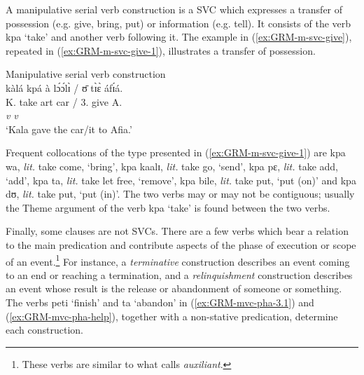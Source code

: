 
\z 
 \z

 
A  manipulative serial verb construction \citep[378]{Amek06} is a SVC
which  expresses a transfer of possession (e.g. give, bring, put)  or  
information (e.g. tell). It consists of the verb {\sls kpa} `take' and another
verb following it. The example in (\ref{ex:GRM-m-svc-give}), repeated in 
(\ref{ex:GRM-m-svc-give-1}), 
illustrates a transfer of possession. 

\newpage 
\begin{exe}

\ex\label{ex:GRM-m-svc-give-1}{\rm Manipulative serial verb construction}\\
\glll  kàlá kpá  {à lɔ́ɔ́lɪ̀ / ʊ̄} tɪ̀ɛ̀ áfɪ́á.\\
K. take  {{\sc art} car / 3.\sg} give A.\\
{} {\it v} {}  {\it v} {}\\
\glt  `Kala gave the car/it to Afia.'
 
\end{exe}

Frequent collocations of the type presented in (\ref{ex:GRM-m-svc-give-1}) are {\sls kpa wa}, {\it lit.}  take come,  `bring',  {\sls kpa kaalɪ}, {\it lit.} take go, `send', {\sls kpa pɛ}, {\it lit.} take add,  `add', {\sls kpa ta}, {\it lit.} take let free, `remove', {\sls kpa bile}, {\it lit.} take put,  `put (on)'  and {\sls kpa dʊ}, {\it lit.} take put,  `put (in)'. The two verbs may or may not be contiguous;  usually the Theme argument of the  verb {\sls kpa} `take'  is found between the two verbs.


Finally, some  clauses are not  SVCs.  There are a few verbs which bear a relation to the main predication and  contribute  aspects of the phase of execution or scope of an event.\footnote{These verbs are similar to what \citet[108]{Bonv88} calls {\it auxiliant}.} For instance, a {\it terminative}  construction describes an event coming to an end or reaching a termination, and  a {\it relinquishment} construction describes an event whose result is the release or abandonment of someone or something.  The verbs {\sls peti} `finish' and {\sls ta} `abandon' in (\ref{ex:GRM-mvc-pha-3.1}) and (\ref{ex:GRM-mvc-pha-help}), together with a non-stative predication, determine each construction. 

